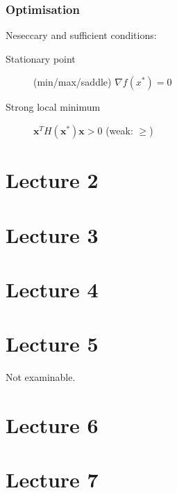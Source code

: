 \documentclass[a4paper,twocolumn,10pt]{article}
\begin{document}
\subsubsection{Optimisation}
Neseccary and sufficient conditions:
\begin{description}
    \item[Stationary point] (min/max/saddle) $\nabla f\left(x^{*}\right)=0$
    \item[Strong local minimum] $\boldsymbol{x}^{T} H\left(\boldsymbol{x}^{*}\right) \boldsymbol{x}>0$ (weak: $\geq$) 
\end{description}

\section{Lecture 2}

\section{Lecture 3}

\section{Lecture 4}

\section{Lecture 5}

Not examinable.

\section{Lecture 6}

\section{Lecture 7}
\end{document}
